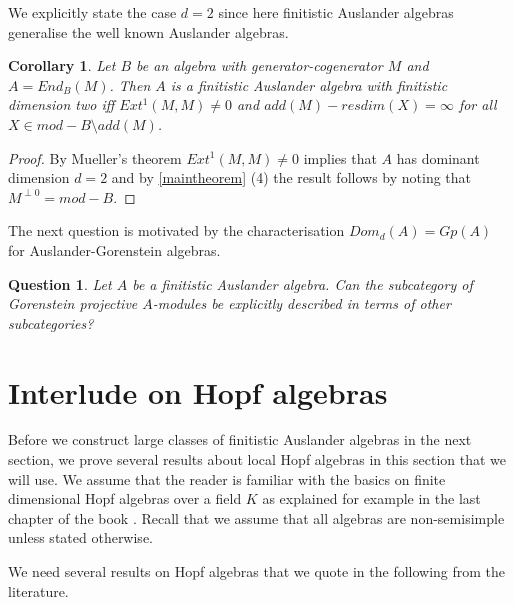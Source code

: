 \documentclass[a4paper]{amsart}
\newtheorem{corollary}[theorem]{Corollary}
\newtheorem{question}[theorem]{Question}
\theoremstyle{definition}
\theoremstyle{remark}
\numberwithin{equation}{theorem}
\begin{document}
We explicitly state the case $d=2$ since here finitistic Auslander algebras generalise the well known Auslander algebras.
\begin{corollary}
Let $B$ be an algebra with generator-cogenerator $M$ and $A=End_B(M)$. Then $A$ is a finitistic Auslander algebra with finitistic dimension two iff $Ext^{1}(M,M) \neq 0$ and $add(M)-resdim(X)= \infty$ for all $X \in mod-B \setminus add(M)$.
\end{corollary}
\begin{proof}
By Mueller's theorem $Ext^{1}(M,M) \neq 0$ implies that $A$ has dominant dimension $d=2$ and by \ref{maintheorem} (4) the result follows by noting that $M^{\perp 0}=mod-B$.
\end{proof}

The next question is motivated by the characterisation $Dom_d(A)=Gp(A)$ for Auslander-Gorenstein algebras.
\begin{question}
Let $A$ be a finitistic Auslander algebra. Can the subcategory of Gorenstein projective $A$-modules be explicitly described in terms of other subcategories?

\end{question}

\section{Interlude on Hopf algebras}
Before we construct large classes of finitistic Auslander algebras in the next section, we prove several results about local Hopf algebras in this section that we will use. We assume that the reader is familiar with the basics on finite dimensional Hopf algebras over a field $K$ as explained for example in the last chapter of the book \cite{SkoYam}. Recall that we assume that all algebras are non-semisimple unless stated otherwise.

We need several results on Hopf algebras that we quote in the following from the literature.
\end{document}

